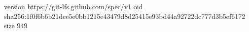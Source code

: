 version https://git-lfs.github.com/spec/v1
oid sha256:1f0f6b6b21dce5e0bb1215e43479d8d25415e93bd44a92722dc777d3b5ef6172
size 949
